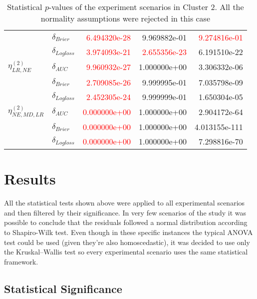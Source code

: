 \begin{table}[!h]
\begin{tabular}{l|lrrr}
                             & $\delta_{Brier}$ &  \textcolor{red}{6.494320e-28} &  9.969882e-01 &   \textcolor{red}{9.274816e-01} \\
                             & $\delta_{Logloss}$ &  \textcolor{red}{3.974093e-21} &  \textcolor{red}{2.655356e-23} &   6.191510e-22 \\
                             \hline
        $\eta^{(2)}_{LR, NE}$ & $\delta_{AUC}$ &  \textcolor{red}{9.960932e-27} &  1.000000e+00 &   3.306332e-06 \\
                             & $\delta_{Brier}$ &  \textcolor{red}{2.709085e-26} &  9.999995e-01 &   7.035798e-09 \\
                             & $\delta_{Logloss}$ &  \textcolor{red}{2.452305e-24} &  9.999999e-01 &   1.650304e-05 \\
                             \hline
        $\eta^{(2)}_{NE, MD, LR}$ & $\delta_{AUC}$ &  \textcolor{red}{0.000000e+00} &  1.000000e+00 &   2.904172e-64 \\
                             & $\delta_{Brier}$ &  \textcolor{red}{0.000000e+00} &  1.000000e+00 &  4.013155e-111 \\
                             & $\delta_{Logloss}$ &  \textcolor{red}{0.000000e+00} &  1.000000e+00 &   7.298816e-70 \\
        \bottomrule
\end{tabular}        
\caption{Statistical $p$-values of the experiment scenarios in Cluster 2. All the normality assumptions were rejected in this case}
\label{table:result-cluster2}
\end{table}

\section{Results}

All the statistical tests shown above were applied to all experimental scenarios and then filtered by their significance. In very few scenarios of the study it was possible to conclude that the residuals followed a normal distribution according to Shapiro-Wilk test. Even though in these specific instances the typical ANOVA test could be used (given they're also homoscedastic), it was decided to use only the Kruskal–Wallis test so every experimental scenario uses the same statistical framework.

\subsection{Statistical Significance}

